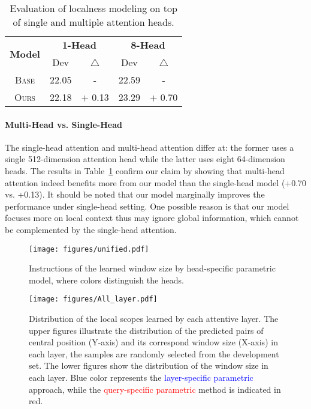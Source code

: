 \documentclass[11pt,a4paper]{article}
\begin{document}
\begin{table}[h]
  \centering
  \setcounter{table}{4}
\begin{tabular}{c||cc|cc}\multirow{2}{*}{\bf Model} & \multicolumn{2}{c}{\bf 1-Head}  & \multicolumn{2}{|c}{\bf 8-Head}  \\ 
\cline{2-5}
    &   Dev &   $\bigtriangleup$    &   Dev &   $\bigtriangleup$\\
\hline \hline
\textsc{Base}   & 22.05  & -       &   22.59   & - \\
 \textsc{Ours}   & 22.18  & + 0.13    &   23.29   & + 0.70\\
  \end{tabular}
  \caption{Evaluation of localness modeling on top of single and multiple attention heads.}
  \label{tab:head}
\end{table}

\paragraph{Multi-Head vs. Single-Head}
The single-head attention and multi-head attention differ at: the former uses a single 512-dimension attention head while the latter uses eight 64-dimension heads.
The results in Table~\ref{tab:head} confirm our claim by showing that multi-head attention indeed benefits more from our model than the single-head model (+0.70 vs. +0.13).
It should be noted that our model marginally improves the performance under single-head setting. One possible reason is that our model focuses more on local context thus may ignore global information, which cannot be complemented by the single-head attention.



\begin{figure}[h]
\begin{center}
\texttt{[image: figures/unified.pdf]}
\caption{Instructions of the learned window size by head-specific parametric model, where colors distinguish the heads. 
\label{fig:glob}
}
\end{center}
\end{figure}


\begin{figure*}[t]
\begin{center}
\texttt{[image: figures/All\_layer.pdf]}
\caption{
\label{fig:window_size}
Distribution of the local scopes learned by each attentive layer. The upper figures illustrate the distribution of the predicted pairs of central position (Y-axis) and its correspond window size (X-axis) in each layer, the samples are randomly selected from the development set. The lower figures show the distribution of the window size in each layer. Blue color represents the \textcolor{blue}{layer-specific parametric} approach, while the \textcolor{red}{query-specific parametric} method is indicated in red. 
}
\end{center}
\end{figure*}
\end{document}
